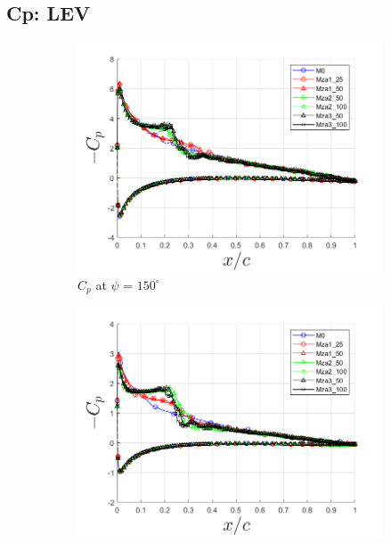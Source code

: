 \subsection{Cp: LEV}
\begin{figure}[H]
\centering

\begin{subfigure}[b]{0.475\textwidth}
	\centering
	\includegraphics[width=1\textwidth]{figures/zonal_adapt_results/Cp/phase_150.png}
	\caption{ $C_p$ at $\psi$ = $150^\circ$}
	\label{fig:zonal_Cp_150}
\end{subfigure}
\begin{subfigure}[b]{0.475\textwidth}
\centering
\includegraphics[width=1\textwidth]{figures/zonal_adapt_results/Cp/phase_180.png}

\end{subfigure}
\end{figure}
